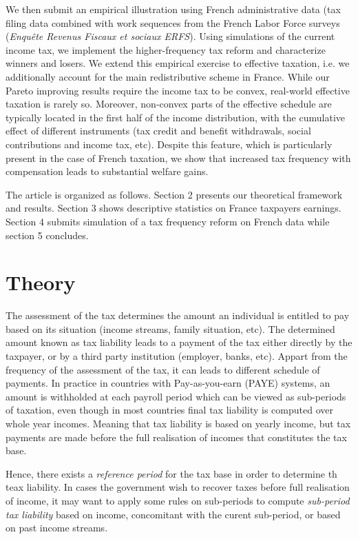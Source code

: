 We then submit an empirical illustration using French administrative data (tax
filing data combined with work sequences from the French Labor Force surveys
(\textit{Enqu\^{e}te Revenus Fiscaux et sociaux ERFS}). Using simulations of
the current income tax, we implement the higher-frequency tax reform and
characterize winners and losers. We extend this empirical exercise to
effective taxation, i.e. we additionally account for the main redistributive
scheme in France. While our Pareto improving results require the income tax to
be convex, real-world effective taxation is rarely so. Moreover, non-convex
parts of the effective schedule are typically located in the first half of the
income distribution, with the cumulative effect of different instruments (tax
credit and benefit withdrawals, social contributions and income tax, etc).
Despite this feature, which is particularly present in the case of French
taxation, we show that increased tax frequency with compensation leads to
substantial welfare gains.

The article is organized as follows. Section 2 presents our theoretical
framework and results. Section 3 shows descriptive statistics on France
taxpayers earnings. Section 4 submits simulation of a tax frequency reform on
French data while section 5 concludes.

\section{Theory}

The assessment of the tax determines the amount an individual is entitled to
pay based on its situation (income streams, family situation, etc). The
determined amount known as tax liability leads to a payment of the tax either
directly by the taxpayer, or by a third party institution (employer, banks,
etc). Appart from the frequency of the assessment of the tax, it can leads to
different schedule of payments. In practice in countries with Pay-as-you-earn
(PAYE) systems, an amount is withholded at each payroll period which can be
viewed as sub-periods of taxation, even though in most countries final tax
liability is computed over whole year incomes. Meaning that tax liability is
based on yearly income, but tax payments are made before the full realisation
of incomes that constitutes the tax base.

Hence, there exists a \emph{reference period} for the tax base in order to
determine th teax liability. In cases the government wish to recover taxes
before full realisation of income, it may want to apply some rules on
sub-periods to compute \emph{sub-period tax liability} based on income,
concomitant with the curent sub-period, or based on past income streams.

